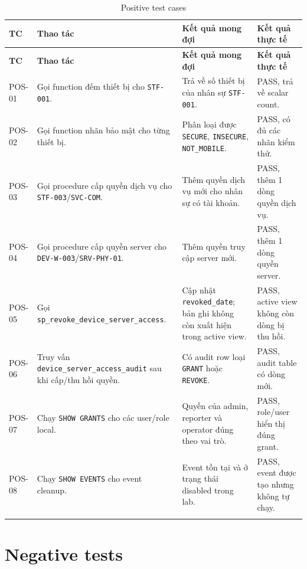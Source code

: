 \documentclass[12pt, a4paper, oneside, openany]{report}
\newcommand{\dbid}[1]{{\normalfont\ttfamily\footnotesize\nolinkurl{#1}}}
\begin{document}
\begin{longtable}{|L{1.4cm}|L{4.6cm}|L{4.0cm}|L{3.4cm}|}
\hline
\textbf{TC} & \textbf{Thao tác} & \textbf{Kết quả mong đợi} & \textbf{Kết quả thực tế} \\
\hline
\endfirsthead
\hline
\textbf{TC} & \textbf{Thao tác} & \textbf{Kết quả mong đợi} & \textbf{Kết quả thực tế} \\
\hline
\endhead
POS-01 & Gọi function đếm thiết bị cho \dbid{STF-001}. & Trả về số thiết bị của nhân sự \dbid{STF-001}. & PASS, trả về scalar count. \\
\hline
POS-02 & Gọi function nhãn bảo mật cho từng thiết bị. & Phân loại được \dbid{SECURE}, \dbid{INSECURE}, \dbid{NOT_MOBILE}. & PASS, có đủ các nhãn kiểm thử. \\
\hline
POS-03 & Gọi procedure cấp quyền dịch vụ cho \dbid{STF-003}/\dbid{SVC-COM}. & Thêm quyền dịch vụ mới cho nhân sự có tài khoản. & PASS, thêm 1 dòng quyền dịch vụ. \\
\hline
POS-04 & Gọi procedure cấp quyền server cho \dbid{DEV-W-003}/\dbid{SRV-PHY-01}. & Thêm quyền truy cập server mới. & PASS, thêm 1 dòng quyền server. \\
\hline
POS-05 & Gọi \dbid{sp_revoke_device_server_access}. & Cập nhật \dbid{revoked_date}; bản ghi không còn xuất hiện trong active view. & PASS, active view không còn dòng bị thu hồi. \\
\hline
POS-06 & Truy vấn \dbid{device_server_access_audit} sau khi cấp/thu hồi quyền. & Có audit row loại \dbid{GRANT} hoặc \dbid{REVOKE}. & PASS, audit table có dòng mới. \\
\hline
POS-07 & Chạy \texttt{SHOW GRANTS} cho các user/role local. & Quyền của admin, reporter và operator đúng theo vai trò. & PASS, role/user hiển thị đúng grant. \\
\hline
POS-08 & Chạy \texttt{SHOW EVENTS} cho event cleanup. & Event tồn tại và ở trạng thái disabled trong lab. & PASS, event được tạo nhưng không tự chạy. \\
\hline
\caption{Positive test cases}
\end{longtable}
\clearpage
\section{Negative tests}
\end{document}
